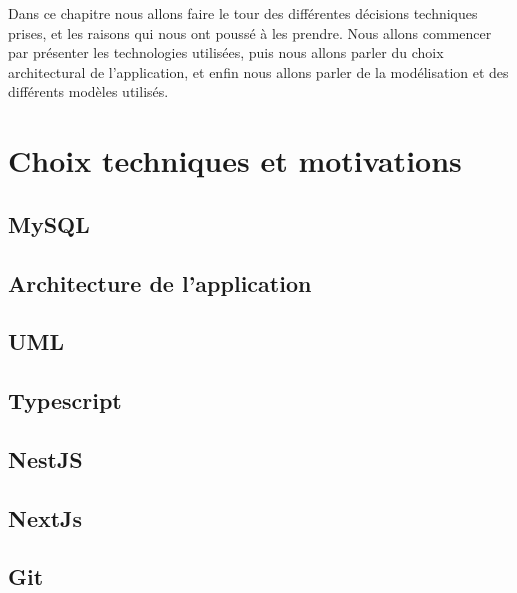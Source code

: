 Dans ce chapitre nous allons faire le tour des différentes décisions techniques
prises, et les raisons qui nous ont poussé à les prendre. Nous allons commencer
par présenter les technologies utilisées, puis nous allons parler du choix
architectural de l'application, et enfin nous allons parler de la modélisation et des différents modèles utilisés.

\section{Choix techniques et motivations}\label{sec: conception-choix-techniques-et-motivation}
    \subsection{MySQL}\label{subsec:conception-mysql}
    

    \subsection{Architecture de l'application}\label{subsec: conception-application-architecture}
    

    \subsection{UML}\label{subsec: conception-modeling-uml}
    

    \subsection{Typescript}\label{subsec: conception-typescript}
    

    \subsection{NestJS}\label{subsec: conception-nestjs}
    

    \subsection{NextJs}\label{subsec: conception-nextjs}
    

    \subsection{Git}\label{subsec: conception-git}
    

